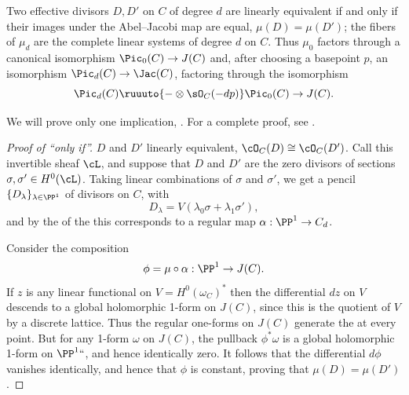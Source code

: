 \begin{theorem}\label{abel}
Two effective divisors $D, D'$ on $C$ of degree $d$ are linearly
%
equivalent if and only if their images under the Abel--Jacobi map are
equal, $\mu(D) = \mu(D')$; 
the fibers of $\mu_d$ are
the complete linear systems of degree $d$ on $C$. Thus $\mu_0$ factors
through a canonical isomorphism
$\Pic_0(C) \to J(C)$ and, after choosing a basepoint $p$, an
isomorphism $\Pic_d(C) \to \nobreak\Jac(C)$, factoring through the isomorphism
$$
\Pic_d(C) \ruuuto {-\otimes \sO_C(-dp)} \Pic_0(C) \to J(C).
$$
\end{theorem}

We will prove only one implication,
.
For a complete proof,
see \cite[Section 2.2]{Griffiths-Harris1978}.

\begin{proof}[Proof of ``only if'']
$D$ and $D'$ 
linearly equivalent,
$\cO_C(D) \cong \cO_C(D')$. Call this invertible sheaf $\cL$, and suppose that $D$ and $D'$ are the zero divisors of sections $\sigma, \sigma' \in H^0(\cL)$.
Taking linear combinations of $\sigma$ and $\sigma'$, we get a pencil $\{D_\lambda\}_{\lambda \in \PP^1}$ of divisors on $C$, with
$$
D_\lambda  =  V(\lambda_0\sigma + \lambda_1\sigma'),
$$
and by the 
%
of the 
%
this
corresponds to a regular map $\alpha : \PP^1 \to C_d$.  

Consider the composition
$$
\phi = \mu \circ \alpha  :  \PP^1  \to  J(C).
$$
 If $z$ is any linear functional on $V = H^0(\omega_C)^*$ then the differential $dz$  on $V$ descends to a global holomorphic 1-form on
 $J(C)$, since this is the quotient of $V$ by a discrete lattice. Thus
the regular one-forms on $J(C)$ generate the 
%
at every point. But for any 1-form $\omega$ on $J(C)$, the pullback
$\phi^*\omega$ is a global holomorphic 1-form on $\PP^1` `$, and hence
identically zero. It follows that the differential $d\phi$ vanishes
identically, and hence that $\phi$ is constant, proving that $\mu(D)=\mu(D')$.
\end{proof}

